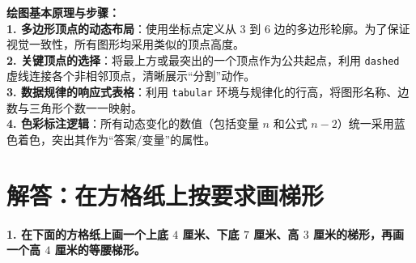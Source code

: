 \vspace{0.6cm}

{\small\color{blue!70!black}
\textbf{绘图基本原理与步骤：}\\
\textbf{1. 多边形顶点的动态布局}：使用坐标点定义从 $3$ 到 $6$ 边的多边形轮廓。为了保证视觉一致性，所有图形均采用类似的顶点高度。\\
\textbf{2. 关键顶点的选择}：将最上方或最突出的一个顶点作为公共起点，利用 \texttt{dashed} 虚线连接各个非相邻顶点，清晰展示“分割”动作。\\
\textbf{3. 数据规律的响应式表格}：利用 \texttt{tabular} 环境与规律化的行高，将图形名称、边数与三角形个数一一映射。\\
\textbf{4. 色彩标注逻辑}：所有动态变化的数值（包括变量 $n$ 和公式 $n-2$）统一采用蓝色着色，突出其作为“答案/变量”的属性。
}



\newpage



\section{解答：在方格纸上按要求画梯形}

\vspace{0.4cm}

\noindent\textbf{1. 在下面的方格纸上画一个上底 $4$ 厘米、下底 $7$ 厘米、高 $3$ 厘米的梯形，再画一个高 $4$ 厘米的等腰梯形。}

\vspace{0.8cm}

